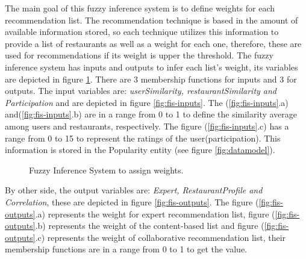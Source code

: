 The main goal of this fuzzy inference system is to define weights for
each recommendation list. The recommendation technique is based in the
amount of available information stored, so each technique utilizes
this information to provide a list of restaurants as well as a weight
for each one, therefore, these are used for  recommendations if its
weight is upper the threshold.  The fuzzy inference system has inputs
and outputs to infer each list's weight, its variables are depicted in
figure \ref{fig:fis-pesos}.  There are 3 membership functions for
inputs and 3 for outputs. The input variables are:
\textit{userSimilarity, restaurantSimilarity and Participation} and
are depicted in figure \ref{fig:fis-inputs}. The (\ref{fig:fis-inputs}.a) 
and(\ref{fig:fis-inputs}.b) are in a range from 0 to 1 to
define the similarity average among users and restaurants,
respectively. The figure (\ref{fig:fis-inputs}.c) has a range from 0
to 15  to represent the ratings of the user(participation). This
information is stored in the Popularity entity (see figure
\ref{fig:datamodel}). \\
\begin{figure}
\captionsetup{justification=centering,margin=2cm,font=footnotesize}
\centering
{}
\caption{Fuzzy Inference System to assign weights.}
\label{fig:fis-pesos}       
\end{figure}
By other side, the output variables are: \textit{Expert,
RestaurantProfile and Correlation}, these are depicted in figure
\ref{fig:fis-outputs}. The figure (\ref{fig:fis-outputs}.a) represents
the weight for expert recommendation list, figure (\ref{fig:fis-outputs}.b) 
represents the weight of the content-based list and figure
(\ref{fig:fis-outputs}.c) represents the weight of collaborative
recommendation list, their membership functions are in a range from 0
to 1 to get the value.
